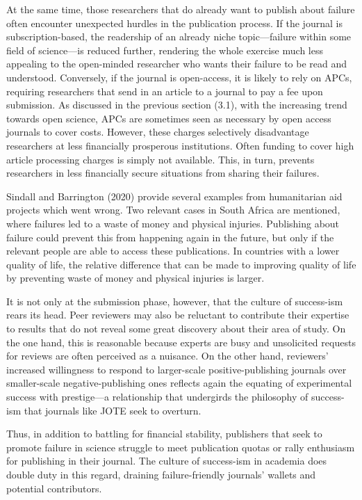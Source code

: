 \documentclass{article}
\begin{document}
At the same time, those researchers that do already want to publish about failure often encounter unexpected hurdles in the publication process. If the journal is subscription-based, the readership of an already niche topic—failure within some field of science—is reduced further, rendering the whole exercise much less appealing to the open-minded researcher who wants their failure to be read and understood. Conversely, if the journal is open-access, it is likely to rely on APCs, requiring researchers that send in an article to a journal to pay a fee upon submission. As discussed in the previous section (3.1), with the increasing trend towards open science, APCs are sometimes seen as necessary by open access journals to cover costs. However, these charges selectively disadvantage researchers at less financially prosperous institutions. Often funding to cover high article processing charges is simply not available. This, in turn, prevents researchers in less financially secure situations from sharing their failures.

Sindall and Barrington (2020) provide several examples from humanitarian aid projects which went wrong. Two relevant cases in South Africa are mentioned, where failures led to a waste of money and physical injuries. Publishing about failure could prevent this from happening again in the future, but only if the relevant people are able to access these publications. In countries with a lower quality of life, the relative difference that can be made to improving quality of life by preventing waste of money and physical injuries is larger. 

It is not only at the submission phase, however, that the culture of success-ism rears its head. Peer reviewers may also be reluctant to contribute their expertise to results that do not reveal some great discovery about their area of study. On the one hand, this is reasonable because experts are busy and unsolicited requests for reviews are often perceived as a nuisance. On the other hand, reviewers' increased willingness to respond to larger-scale positive-publishing journals over smaller-scale negative-publishing ones reflects again the equating of experimental success with prestige—a relationship that undergirds the philosophy of success-ism that journals like JOTE seek to overturn. 

Thus, in addition to battling for financial stability, publishers that seek to promote failure in science struggle to meet publication quotas or rally enthusiasm for publishing in their journal. The culture of success-ism in academia does double duty in this regard, draining failure-friendly journals' wallets and potential contributors.
\end{document}
